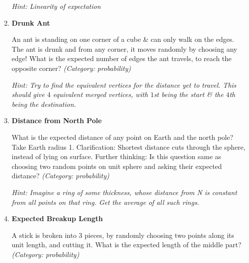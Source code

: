 \begin{enumerate}
\small\emph{Hint: Linearity of expectation}





\item \textbf{Drunk Ant}

An ant is standing on one corner of a cube \& can only walk on the edges. The ant is drunk and from any corner, it moves randomly by choosing any edge! What is the expected number of edges the ant travels, to reach the opposite corner?
\small\emph{(Category: probability)}

\small\emph{Hint: Try to find the equivalent vertices for the distance yet to travel. This should give $4$ equivalent merged vertices, with $1$st being the start \& the $4$th being the destination.}





\item \textbf{Distance from North Pole}

What is the expected distance of any point on Earth and the north pole? Take Earth radius 1.
Clarification: Shortest distance cuts through the sphere, instead of lying on surface.
Further thinking: Is this question same as choosing two random points on unit sphere and asking their expected distance?
\small\emph{(Category: probability)}

\small\emph{Hint: Imagine a ring of some thickness, whose distance from N is constant from all points on that ring. Get the average of all such rings.}





\item \textbf{Expected Breakup Length}

A stick is broken into 3 pieces, by randomly choosing two points along its unit length, and cutting it. What is the expected length of the middle part?
\small\emph{(Category: probability)}


\end{enumerate}
